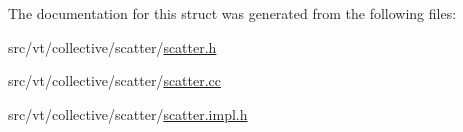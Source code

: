 The documentation for this struct was generated from the following files\+:\begin{DoxyCompactItemize}
\item 
src/vt/collective/scatter/\hyperlink{scatter_8h}{scatter.\+h}\item 
src/vt/collective/scatter/\hyperlink{scatter_8cc}{scatter.\+cc}\item 
src/vt/collective/scatter/\hyperlink{scatter_8impl_8h}{scatter.\+impl.\+h}\end{DoxyCompactItemize}

